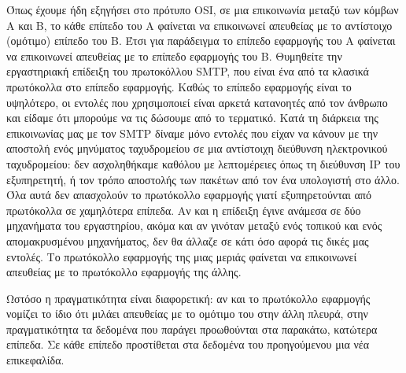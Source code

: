 Όπως έχουμε ήδη εξηγήσει στο πρότυπο OSI, σε μια επικοινωνία μεταξύ των κόμβων Α και Β, το κάθε επίπεδο του Α φαίνεται να επικοινωνεί απευθείας με το αντίστοιχο (ομότιμο) επίπεδο του Β. Έτσι για παράδειγμα το επίπεδο εφαρμογής του Α φαίνεται να επικοινωνεί απευθείας με το επίπεδο εφαρμογής του Β. Θυμηθείτε την εργαστηριακή επίδειξη του πρωτοκόλλου SMTP, που είναι ένα από τα κλασικά πρωτόκολλα στο επίπεδο εφαρμογής. Καθώς το επίπεδο εφαρμογής είναι το υψηλότερο, οι εντολές που χρησιμοποιεί είναι αρκετά κατανοητές από τον άνθρωπο και είδαμε ότι μπορούμε να τις δώσουμε από το τερματικό. Κατά τη διάρκεια της επικοινωνίας μας με τον SMTP δίναμε μόνο εντολές που είχαν να κάνουν με την αποστολή ενός μηνύματος ταχυδρομείου σε μια αντίστοιχη διεύθυνση ηλεκτρονικού ταχυδρομείου: δεν ασχοληθήκαμε καθόλου με λεπτομέρειες όπως τη διεύθυνση IP του εξυπηρετητή, ή τον τρόπο αποστολής των πακέτων από τον ένα υπολογιστή στο άλλο. Όλα αυτά δεν απασχολούν το πρωτόκολλο εφαρμογής γιατί εξυπηρετούνται από πρωτόκολλα σε χαμηλότερα επίπεδα. Αν και η επίδειξη έγινε ανάμεσα σε δύο μηχανήματα του εργαστηρίου, ακόμα και αν γινόταν μεταξύ ενός τοπικού και ενός απομακρυσμένου μηχανήματος, δεν θα άλλαζε σε κάτι όσο αφορά τις δικές μας εντολές. Το πρωτόκολλο εφαρμογής της μιας μεριάς φαίνεται να επικοινωνεί απευθείας με το πρωτόκολλο εφαρμογής της άλλης.

Ωστόσο η πραγματικότητα είναι διαφορετική: αν και το πρωτόκολλο εφαρμογής νομίζει το ίδιο ότι μιλάει απευθείας με το ομότιμο του στην άλλη πλευρά, στην πραγματικότητα τα δεδομένα που παράγει προωθούνται στα παρακάτω, κατώτερα επίπεδα. Σε κάθε επίπεδο προστίθεται στα δεδομένα του προηγούμενου μια νέα επικεφαλίδα.


